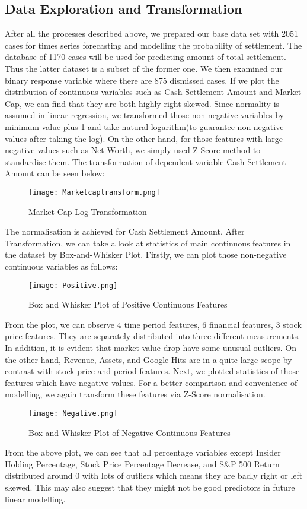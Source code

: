 \subsection{Data Exploration and Transformation}
After all the processes described above, we prepared our base data set with 2051 cases for times series forecasting and modelling the probability of settlement. The database of 1170 cases will be used for predicting amount of total settlement. Thus the latter dataset is a subset of the former one. We then examined our binary response variable where there are 875 dismissed cases. If we plot the distribution of continuous variables such as Cash Settlement Amount and Market Cap, we can find that they are both highly right skewed. Since normality is assumed in linear regression, we transformed those non-negative variables by minimum value plus 1 and take natural logarithm(to guarantee non-negative values after taking the log). On the other hand, for those features with large negative values such as Net Worth, we simply used Z-Score method to standardise them. The transformation of dependent variable Cash Settlement Amount can be seen below:
  \begin{figure}[H]
  \centering
  \texttt{[image: Marketcaptransform.png]}
  \caption{Market Cap Log Transformation}
\end{figure}
The normalisation is achieved for Cash Settlement Amount. After Transformation, we can take a look at statistics of main continuous features in the dataset by Box-and-Whisker Plot. Firstly, we can plot those non-negative continuous variables as follows:
 \begin{figure}[H]
  \centering
  \texttt{[image: Positive.png]}
  \caption{Box and Whisker Plot of Positive Continuous Features}
\end{figure}
From the plot, we can observe 4 time period features, 6 financial features, 3 stock price features. They are separately distributed into three different measurements. In addition, it is evident that market value drop have some unusual outliers. On the other hand, Revenue, Assets, and Google Hits are in a quite large scope by contrast with stock price and period features. Next,  we plotted statistics of those features which have negative values. For a better comparison and convenience of modelling, we again transform these features via Z-Score normalisation. 
\begin{figure}[H]
  \centering
  \texttt{[image: Negative.png]}
  \caption{Box and Whisker Plot of Negative Continuous Features}
\end{figure}
From the above plot, we can see that all percentage variables except Insider Holding Percentage, Stock Price Percentage Decrease, and S\&P 500 Return distributed around 0 with lots of outliers which means they are badly right or left skewed. This may also suggest that they might not be good predictors in future linear modelling. 

